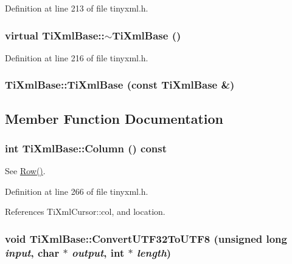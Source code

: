 Definition at line 213 of file tinyxml.h.\hypertarget{class_ti_xml_base_ad1837ecb25a913612fa1115f090cbb56}{
\subsubsection[{$\sim$TiXmlBase}]{\setlength{\rightskip}{0pt plus 5cm}virtual TiXmlBase::$\sim$TiXmlBase ()}}
\label{class_ti_xml_base_ad1837ecb25a913612fa1115f090cbb56}


Definition at line 216 of file tinyxml.h.\hypertarget{class_ti_xml_base_a626975d7fb27b0a471142ca582b561b4}{
\subsubsection[{TiXmlBase}]{\setlength{\rightskip}{0pt plus 5cm}TiXmlBase::TiXmlBase (const {\bf TiXmlBase} \&)}}
\label{class_ti_xml_base_a626975d7fb27b0a471142ca582b561b4}


\subsection{Member Function Documentation}
\hypertarget{class_ti_xml_base_ab54bfb9b70fe6dd276e7b279cab7f003}{
\subsubsection[{Column}]{\setlength{\rightskip}{0pt plus 5cm}int TiXmlBase::Column () const}}
\label{class_ti_xml_base_ab54bfb9b70fe6dd276e7b279cab7f003}


See \hyperlink{class_ti_xml_base_a024bceb070188df92c2a8d8852dd0853}{Row()}. 

Definition at line 266 of file tinyxml.h.

References TiXmlCursor::col, and location.\hypertarget{class_ti_xml_base_a07c765e3a7f979d343e646ea797b180b}{
\subsubsection[{ConvertUTF32ToUTF8}]{\setlength{\rightskip}{0pt plus 5cm}void TiXmlBase::ConvertUTF32ToUTF8 (unsigned long {\em input}, \/  char $\ast$ {\em output}, \/  int $\ast$ {\em length})}}
\label{class_ti_xml_base_a07c765e3a7f979d343e646ea797b180b}


